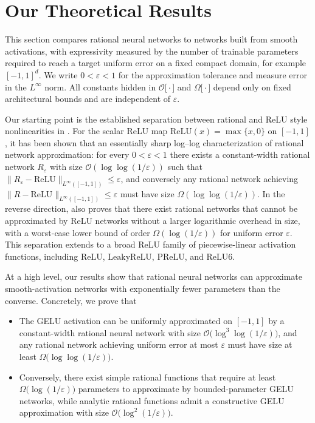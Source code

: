 \documentclass{article}
\theoremstyle{plain}
\theoremstyle{definition}
\theoremstyle{remark}
\newcommand{\Linf}{L^\infty}
\newcommand{\BigO}{\mathcal{O}}
\newcommand{\BigOmega}{\Omega}
\begin{document}
\section{Our Theoretical Results}
\label{sec:theory}

This section compares rational neural networks to networks built from smooth activations, with expressivity measured by the number of trainable parameters required to reach a target uniform error on a fixed compact domain, for example $[-1,1]^d$. We write $0<\varepsilon<1$ for the approximation tolerance and measure error in the $\Linf$ norm. All constants hidden in $\BigO\bigl[\cdot\bigr]$ and $\BigOmega\bigl[\cdot\bigr]$ depend only on fixed architectural bounds and are independent of $\varepsilon$.

Our starting point is the established separation between rational and ReLU style nonlinearities in \citet{boulle2020rational}. For the scalar ReLU map $\mathrm{ReLU}(x)=\max\{x,0\}$ on $[-1,1]$, it has been shown that an essentially sharp log--log characterization of rational network approximation: for every $0<\varepsilon<1$ there exists a constant-width rational network $R_\varepsilon$ with size $\mathcal{O}(\log\log(1/\varepsilon))$ such that $\|R_\varepsilon-\mathrm{ReLU}\|_{L^\infty([-1,1])}\le \varepsilon$, and conversely any rational network achieving $\|R-\mathrm{ReLU}\|_{L^\infty([-1,1])}\le \varepsilon$ must have size $\Omega(\log\log(1/\varepsilon))$. In the reverse direction, \citet{boulle2020rational} also proves that there exist rational networks that cannot be approximated by ReLU networks without a larger logarithmic overhead in size, with a worst-case lower bound of order $\Omega(\log(1/\varepsilon))$ for uniform error $\varepsilon$. This separation extends to a broad ReLU family of piecewise-linear activation functions, including $\mathrm{ReLU}$, $\mathrm{LeakyReLU}$, $\mathrm{PReLU}$, and $\mathrm{ReLU6}$.

At a high level, our results show that rational neural networks can approximate smooth-activation networks with exponentially fewer parameters than the converse. Concretely, we prove that
\begin{itemize}
\item The GELU activation can be uniformly approximated on $[-1,1]$ by a constant-width rational neural network with size $\mathcal{O}\bigl(\log^3\!\log(1/\varepsilon)\bigr)$, and any rational network achieving uniform error at most $\varepsilon$ must have size at least $\Omega\bigl(\log\!\log(1/\varepsilon)\bigr)$.
\item Conversely, there exist simple rational functions that require at least $\Omega\bigl(\log(1/\varepsilon)\bigr)$ parameters to approximate by bounded-parameter GELU networks, while analytic rational functions admit a constructive GELU approximation with size $\mathcal{O}\bigl(\log^2(1/\varepsilon)\bigr)$.
\end{itemize}
\end{document}
